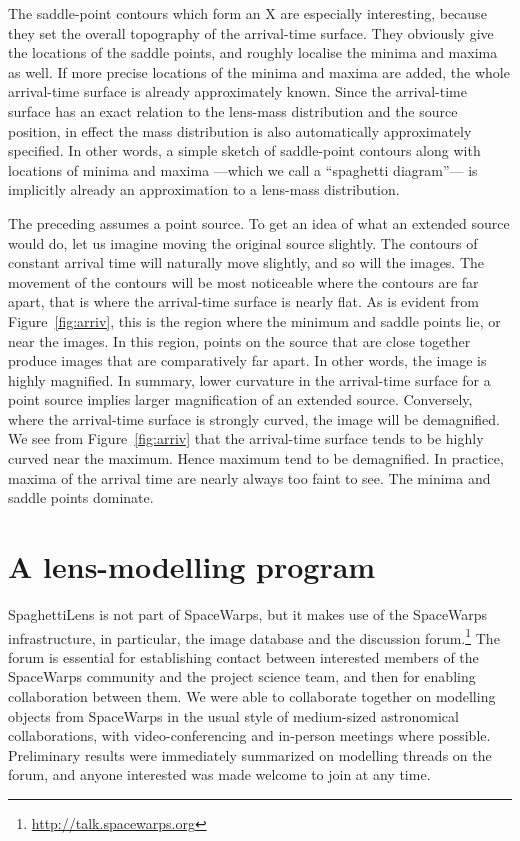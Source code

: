 \documentclass[usenatbib]{mn2e}
\newcommand{\spl}{SpaghettiLens\xspace}
\newcommand{\sw}{SpaceWarps\xspace}
\newcommand{\figref}[1]{Figure~\ref{fig:#1}}
\begin{document}
The saddle-point contours which form an X are especially interesting,
because they set the overall topography of the arrival-time surface.
They obviously give the locations of the saddle points, and roughly
localise the minima and maxima as well.  If more precise locations of
the minima and maxima are added, the whole arrival-time surface is
already approximately known.  Since the arrival-time surface has an
exact relation to the lens-mass distribution and the source position,
in effect the mass distribution is also automatically approximately
specified.  In other words, a simple sketch of saddle-point contours
along with locations of minima and maxima ---which we call a
``spaghetti diagram''--- is implicitly already an approximation to a
lens-mass distribution.

The preceding assumes a point source.  To get an idea of what an
extended source would do, let us imagine moving the original source
slightly.  The contours of constant arrival time will naturally move
slightly, and so will the images.  The movement of the contours will
be most noticeable where the contours are far apart, that is where the
arrival-time surface is nearly flat.  As is evident from
\figref{arriv}, this is the region where the minimum and saddle points
lie, or near the images.  In this region, points on the source that
are close together produce images that are comparatively far apart.
In other words, the image is highly magnified.  In summary, lower
curvature in the arrival-time surface for a point source implies
larger magnification of an extended source.  Conversely, where the
arrival-time surface is strongly curved, the image will be
demagnified.  We see from \figref{arriv} that the arrival-time surface
tends to be highly curved near the maximum.  Hence maximum tend to be
demagnified.  In practice, maxima of the arrival time are nearly
always too faint to see. The minima and saddle points dominate.



\section{A lens-modelling program}
\label{sec:SpaghettiLens}

\spl is not part of \sw, but it makes use of the \sw infrastructure,
in particular, the image database and the discussion
forum.\footnote{\url{ http://talk.spacewarps.org}}  The forum is
essential for establishing contact between interested members of the
\sw community and the project science team, and then for enabling
collaboration between them. We were able to collaborate together on
modelling objects from \sw in the usual style of medium-sized
astronomical collaborations, with video-conferencing and in-person
meetings where possible. Preliminary results were immediately
summarized on modelling threads on the forum, and anyone interested
was made welcome to join at any time.
\end{document}
